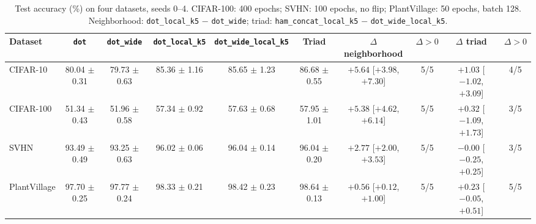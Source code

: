 
\begin{table}[!t]
\centering
\small
\caption{Test accuracy (\%) on four datasets, seeds 0--4. CIFAR-100: 400 epochs; SVHN: 100 epochs, no flip; PlantVillage: 50 epochs, batch 128. Neighborhood: \texttt{dot\_local\_k5} $-$ \texttt{dot\_wide}; triad: \texttt{ham\_concat\_local\_k5} $-$ \texttt{dot\_wide\_local\_k5}.}
\label{tab:datos}
\begin{adjustbox}{max width=\linewidth}
\begin{tabular}{lccccccccc}
\toprule
Dataset & \texttt{dot} & \texttt{dot\_wide} & \texttt{dot\_local\_k5} & \texttt{dot\_wide\_local\_k5} & Triad & $\Delta$ neighborhood & $\Delta>0$ & $\Delta$ triad & $\Delta>0$ \\
\midrule
CIFAR-10 & 80.04 $\pm$ 0.31 & 79.73 $\pm$ 0.63 & 85.36 $\pm$ 1.16 & 85.65 $\pm$ 1.23 & 86.68 $\pm$ 0.55 & $+5.64$ [$+3.98$, $+7.30$] & 5/5 & $+1.03$ [$-1.02$, $+3.09$] & 4/5 \\
CIFAR-100 & 51.34 $\pm$ 0.43 & 51.96 $\pm$ 0.58 & 57.34 $\pm$ 0.92 & 57.63 $\pm$ 0.68 & 57.95 $\pm$ 1.01 & $+5.38$ [$+4.62$, $+6.14$] & 5/5 & $+0.32$ [$-1.09$, $+1.73$] & 3/5 \\
SVHN & 93.49 $\pm$ 0.49 & 93.25 $\pm$ 0.63 & 96.02 $\pm$ 0.06 & 96.04 $\pm$ 0.14 & 96.04 $\pm$ 0.20 & $+2.77$ [$+2.00$, $+3.53$] & 5/5 & $-0.00$ [$-0.25$, $+0.25$] & 3/5 \\
PlantVillage & 97.70 $\pm$ 0.25 & 97.77 $\pm$ 0.24 & 98.33 $\pm$ 0.21 & 98.42 $\pm$ 0.23 & 98.64 $\pm$ 0.13 & $+0.56$ [$+0.12$, $+1.00$] & 5/5 & $+0.23$ [$-0.05$, $+0.51$] & 5/5 \\
\bottomrule
\end{tabular}
\end{adjustbox}
\end{table}
